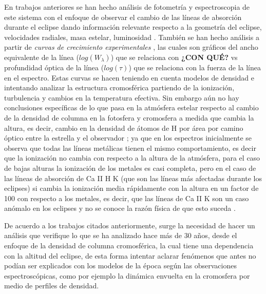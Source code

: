 \documentclass[11pt]{article}
\begin{document}
\noindent En trabajos anteriores se han hecho análisis de fotometría y espectroscopia de este sistema con el enfoque de observar el cambio de las líneas de absorción durante el eclipse dando información relevante respecto a la geometría del eclipse, velocidades radiales, masa estelar, luminosidad \cite{kps9}. También se han hecho análisis a partir de \textit{curvas de crecimiento experimentales} \cite{complete}, las cuales son gráficos del ancho equivalente de la línea ($log(W_{\lambda})$) que se relaciona con \textbf{¿CON QUÉ?} vs profundidad óptica de la línea ($log(\tau)$) que se relaciona con la fuerza de la línea en el espectro. Estas curvas se hacen teniendo en cuenta modelos de densidad e intentando analizar la estructura cromosférica partiendo de la ionización, turbulencia y cambios en la temperatura efectiva. Sin embargo aún no hay conclusiones específicas de lo que pasa en la atmósfera estelar respecto al cambio de la densidad de columna en la fotosfera y cromosfera a medida que cambia la altura, es decir, cambio en la densidad de átomos de H por área por camino óptico entre la estrella y el observador \cite{rybicki2008radiative}; ya que en los espectros inicialmente se observa que todas las líneas metálicas tienen el mismo comportamiento, es decir que la ionización no cambia con respecto a la altura de la atmósfera, para el caso de bajas alturas la ionización de los metales es casi completa, pero en el caso de  las líneas de absorción de Ca II H K (que son las líneas más afectadas durante los eclipses) si cambia la ionización media rápidamente con la altura en un factor de 100 con respecto a los metales, es decir, que las líneas de Ca II K son un caso anómalo en los eclipses y no se conoce la razón física de que esto suceda \cite{complete}.

\noindent De acuerdo a los trabajos citados anteriormente, surge la necesidad de hacer un análisis que verifique lo que se ha analizado hace más de 30 años, desde el enfoque de la densidad de columna cromosférica, la cual tiene una dependencia con la altitud del eclipse, de esta forma intentar aclarar fenómenos que antes no podían ser explicados con los modelos de la época según las observaciones espectroscópicas, como por ejemplo la dinámica envuelta en la cromosfera por medio de perfiles de densidad. 
\end{document}
